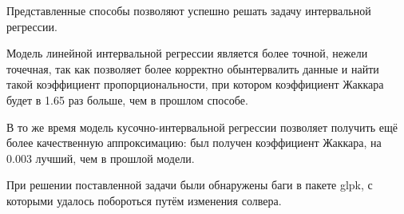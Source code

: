 Представленные способы позволяют успешно решать задачу интервальной регрессии. 

Модель линейной интервальной регрессии является более точной, нежели точечная, так как позволяет более корректно обынтервалить данные и найти такой коэффициент пропорциональности, при котором коэффициент Жаккара будет в 1.65 раз больше, чем в прошлом способе.

В то же время модель кусочно-интервальной регрессии позволяет получить ещё более качественную аппроксимацию: был получен коэффициент Жаккара, на 0.003 лучший, чем в прошлой модели.

При решении поставленной задачи были обнаружены баги в пакете glpk, с которыми удалось побороться путём изменения солвера.